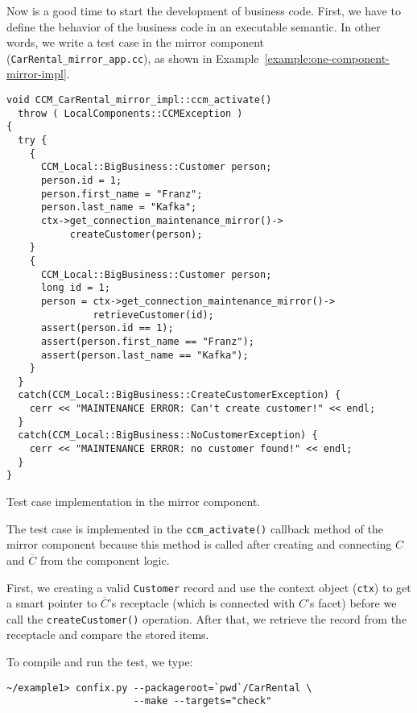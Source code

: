 Now is a good time to start the development of business code. First, we have to
define the behavior of the business code in an executable semantic. In other words, 
we write a test case in the mirror component ({\tt CarRental\_mirror\_app.cc}), as
shown in Example~\ref{example:one-component-mirror-impl}.

\begin{Example}
\begin{minifbox}
\begin{small}
\begin{verbatim}
void CCM_CarRental_mirror_impl::ccm_activate()
  throw ( LocalComponents::CCMException )
{
  try {
    {
      CCM_Local::BigBusiness::Customer person;
      person.id = 1;
      person.first_name = "Franz";
      person.last_name = "Kafka";
      ctx->get_connection_maintenance_mirror()->
           createCustomer(person);
    }
    {
      CCM_Local::BigBusiness::Customer person;
      long id = 1;
      person = ctx->get_connection_maintenance_mirror()->
               retrieveCustomer(id);
      assert(person.id == 1);
      assert(person.first_name == "Franz");
      assert(person.last_name == "Kafka");
    }
  }
  catch(CCM_Local::BigBusiness::CreateCustomerException) {
    cerr << "MAINTENANCE ERROR: Can't create customer!" << endl;
  }
  catch(CCM_Local::BigBusiness::NoCustomerException) {
    cerr << "MAINTENANCE ERROR: no customer found!" << endl;
  }
}
\end{verbatim}
\end{small}
\end{minifbox}
\caption{Test case implementation in the mirror component.}
\label{example:one-component-mirror-impl}
\end{Example}

The test case is implemented in the {\tt ccm\_activate()} callback method of the
mirror component because this method is called after creating and connecting $C$
and $\overline{C}$ from the component logic. 

First, we creating a valid {\tt Customer} record and  
use the context object ({\tt ctx}) to get a smart pointer
to $\overline{C}$'s receptacle (which is connected with $C$'s facet) 
before we call the {\tt createCustomer()} operation. 
After that, we retrieve the record from the receptacle and compare the stored items.

To compile and run the test, we type:
\begin{small}
\begin{verbatim}
~/example1> confix.py --packageroot=`pwd`/CarRental \
                      --make --targets="check"
\end{verbatim}
\end{small}

